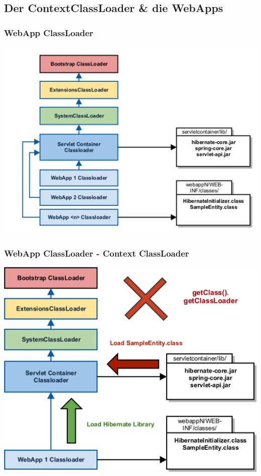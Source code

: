 \documentclass[aspectratio=169]{beamer}
\begin{document}
	\subsection{Der ContextClassLoader \& die WebApps}
	\begin{frame}
		\frametitle{WebApp ClassLoader}
		\begin{center}
			\includegraphics[scale=0.1]{assets/contextclassloader/webappclassloader-1.png} 
		\end{center}
	\end{frame}
	\begin{frame}
		\frametitle{WebApp ClassLoader - Context ClassLoader}
		\begin{center}
			\includegraphics[scale=0.1]{assets/contextclassloader/webappclassloader-2.png} 
		\end{center}
	\end{frame}
\end{document}

